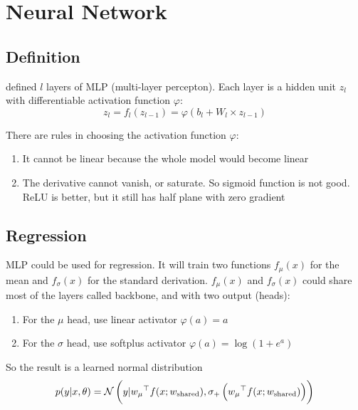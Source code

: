 \chapter{Neural Network}


\section{Definition}

 defined $l$ layers of MLP (multi-layer percepton). Each layer is a hidden unit $z_l$ with differentiable activation function $\varphi$:
\begin{equation}
    z_l = f_l (z_{l-1}) = \varphi (b_l + W_l \times z_{l-1})
\end{equation}


There are rules in choosing the activation function $\varphi$:
\begin{enumerate}
    \item It cannot be linear because the whole model would become linear
    \item The derivative cannot vanish, or saturate. So sigmoid function is not good. ReLU is better, but it still has half plane with zero gradient
\end{enumerate}



\section{Regression}

MLP could be used for regression. It will train two functions $f_\mu (x)$ for the mean and $f_\sigma (x)$ for the standard derivation. $f_\mu(x)$ and $f_\sigma(x)$ could share most of the layers called backbone, and with two output (heads):
\begin{enumerate}
    \item For the $\mu$ head, use linear activator $\varphi(a) = a$
    \item For the $\sigma$ head, use softplus activator $\varphi(a) = \log(1 + e^a)$
\end{enumerate}

So the result is a learned normal distribution
\begin{equation}
    p(y|x,\theta) = \mathcal{N}\left(y| {w_\mu}^\top f(x;w_{\text{shared}}), \sigma_{+} \left( {w_\mu}^\top f(x;w_{\text{shared}}) \right)  \right)
\end{equation}



